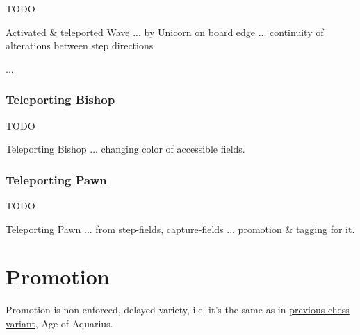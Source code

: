 \huge{TODO}
\normalsize{}

Activated \& teleported Wave ... by Unicorn on board edge ... continuity of alterations between step directions


\clearpage %


...

\clearpage %

\subsubsection*{Teleporting Bishop}

\huge{TODO}
\normalsize{}

Teleporting Bishop ... changing color of accessible fields.

\clearpage %

\subsubsection*{Teleporting Pawn}

\huge{TODO}
\normalsize{}

Teleporting Pawn ... from step-fields, capture-fields ... promotion \& tagging for it.

\clearpage %

\section*{Promotion}

Promotion is non enforced, delayed variety, i.e. it's the same as in
\hyperref[sec:Age of Aquarius/Promotion]{previous chess variant}, Age of Aquarius.

